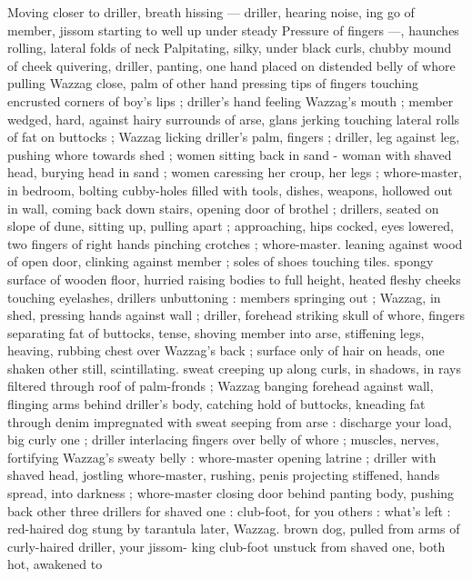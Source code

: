 Moving closer to driller, breath hissing --- driller, hearing noise, 
ing go of member, jissom starting to well up under steady 
Pressure of fingers ---, haunches rolling, lateral folds of neck 
Palpitating, silky, under black curls, chubby mound of cheek 
quivering, driller, panting, one hand placed on distended belly of 
whore pulling Wazzag close, palm of other hand pressing tips of 
fingers touching encrusted corners of boy's lips ; driller's hand 
feeling Wazzag's mouth ; member wedged, hard, against hairy 
surrounds of arse, glans jerking touching lateral rolls of fat on 
buttocks ; Wazzag licking driller's palm, fingers ; driller, leg against 
leg, pushing whore towards shed ; women sitting back in sand - 
woman with shaved head, burying head in sand ; women caressing 
her croup, her legs ; whore-master, in bedroom, bolting cubby-holes 
filled with tools, dishes, weapons, hollowed out in wall, coming back 
down stairs, opening door of brothel ; drillers, seated on slope of 
dune, sitting up, pulling apart ; approaching, hips cocked, eyes 
lowered, two fingers of right hands pinching crotches ; whore-master. 
leaning against wood of open door, clinking against member ; soles 
of shoes touching tiles. spongy surface of wooden floor, hurried 
raising bodies to full height, heated fleshy cheeks touching 
eyelashes, drillers unbuttoning : members springing out ; Wazzag, in 
shed, pressing hands against wall ; driller, forehead striking skull of 
whore, fingers separating fat of buttocks, tense, shoving member 
into arse, stiffening legs, heaving, rubbing chest over Wazzag's back 
; surface only of hair on heads, one shaken other still, scintillating. 
sweat creeping up along curls, in shadows, in rays filtered through 
roof of palm-fronds ; Wazzag banging forehead against wall, flinging 
arms behind driller's body, catching hold of buttocks, kneading fat 
through denim impregnated with sweat seeping from arse :{\td} {\gl}{\td} 
discharge your load, big curly one{\thd}{\gr} ; driller interlacing fingers over 
belly of whore ; muscles, nerves, fortifying Wazzag's sweaty belly : 
whore-master opening latrine ; driller with shaved head, jostling 
whore-master, rushing, penis projecting stiffened, hands spread, into 
darkness ; whore-master closing door behind panting body, pushing 
back other three drillers{\td} {\gl} for shaved one : club-foot, for you others 
: what's left : red-haired dog stung by tarantula{\thd} later, Wazzag. 
brown dog, pulled from arms of curly-haired driller, your jissom- 
king{\thd} club-foot unstuck from shaved one, both hot, awakened to 
